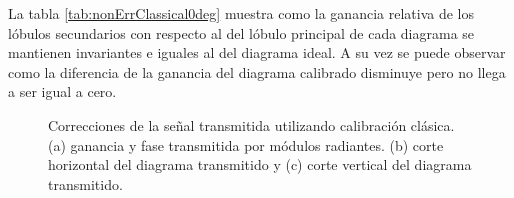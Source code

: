 La tabla \ref{tab:nonErrClassical0deg} muestra como la ganancia relativa de los lóbulos secundarios con respecto al del lóbulo
principal de cada diagrama se mantienen invariantes e iguales al del diagrama ideal. A su vez se puede observar como la diferencia
de la ganancia del diagrama calibrado disminuye pero no llega a ser igual a cero.
\begin{figure}[H]
	\centering

	\caption{Correcciones de la señal transmitida utilizando calibración clásica. (a) ganancia y fase transmitida por módulos
		radiantes. (b) corte horizontal del diagrama transmitido y (c) corte vertical del diagrama transmitido.}
	\label{fig:nonErrClassical0deg}
\end{figure}
